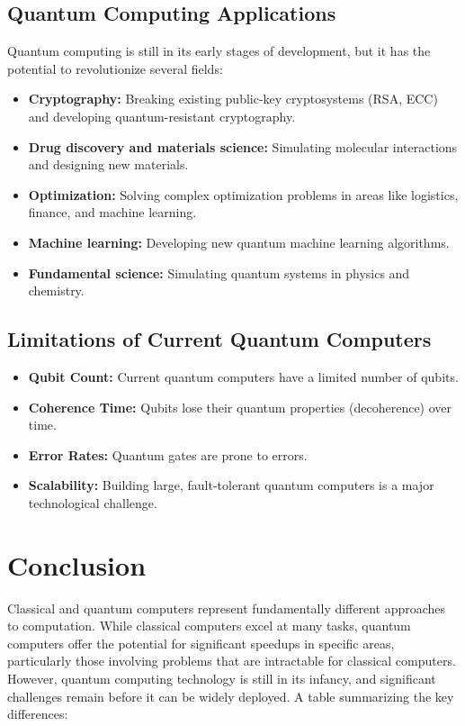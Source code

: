 \documentclass{report}
\begin{document}
\subsection{Quantum Computing Applications}
\label{subsec:quantum-applications}

Quantum computing is still in its early stages of development, but it has the potential to revolutionize several fields:

\begin{itemize}
    \item \textbf{Cryptography:} Breaking existing public-key cryptosystems (RSA, ECC) and developing quantum-resistant cryptography.
    \item \textbf{Drug discovery and materials science:} Simulating molecular interactions and designing new materials.
    \item \textbf{Optimization:} Solving complex optimization problems in areas like logistics, finance, and machine learning.
    \item \textbf{Machine learning:} Developing new quantum machine learning algorithms.
    \item \textbf{Fundamental science:} Simulating quantum systems in physics and chemistry.
\end{itemize}

\subsection{Limitations of Current Quantum Computers}
\label{subsec:quantum-limitations}

\begin{itemize}
    \item \textbf{Qubit Count:} Current quantum computers have a limited number of qubits.
    \item \textbf{Coherence Time:} Qubits lose their quantum properties (decoherence) over time.
    \item \textbf{Error Rates:} Quantum gates are prone to errors.
    \item \textbf{Scalability:} Building large, fault-tolerant quantum computers is a major technological challenge.
\end{itemize}

\section{Conclusion}
\label{sec:comparison-conclusion}

Classical and quantum computers represent fundamentally different approaches to computation. While classical computers excel at many tasks, quantum computers offer the potential for significant speedups in specific areas, particularly those involving problems that are intractable for classical computers. However, quantum computing technology is still in its infancy, and significant challenges remain before it can be widely deployed. A table summarizing the key differences:
\end{document}
